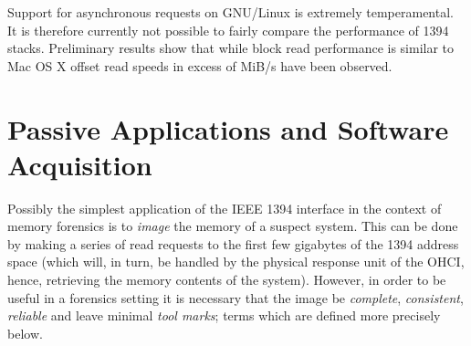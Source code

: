 \documentclass[numbers=noenddot,      %
               abstract,              %
               captions=tableheading, %
               DIV=8]                 %
              {scrartcl}
\begin{document}
Support for asynchronous requests on GNU/Linux is extremely
temperamental. It is therefore currently not possible to fairly compare
the performance of 1394 stacks. Preliminary results show that while
block read performance is similar to Mac OS X offset read speeds in
excess of \unit[300]{MiB/s} have been observed.

\section{Passive Applications and Software Acquisition}
\label{sec:passiveapp}

Possibly the simplest application of the IEEE 1394 interface in the
context of memory forensics is to \emph{image} the memory of a suspect
system. This can be done by making a series of read requests to the
first few gigabytes of the 1394 address space (which will, in turn, be
handled by the physical response unit of the OHCI, hence, retrieving the
memory contents of the system). However, in order to be useful in a
forensics setting it is necessary that the image be \emph{complete},
\emph{consistent}, \emph{reliable} and leave minimal \emph{tool marks};
terms which are defined more precisely below.
\end{document}

